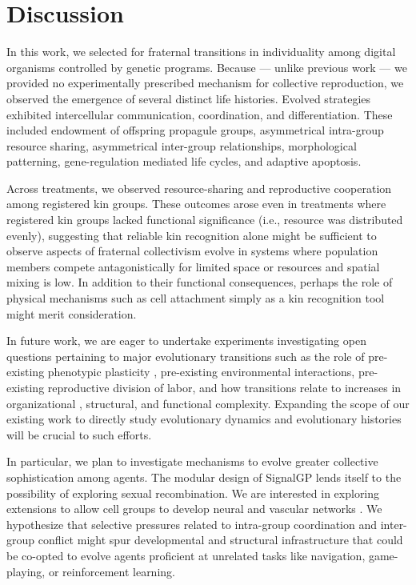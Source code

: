 \section{Discussion}


In this work, we selected for fraternal transitions in individuality among digital organisms controlled by genetic programs.
Because --- unlike previous work \citep{goldsby2012task, goldsby2014evolutionary} --- we provided no experimentally prescribed mechanism for collective reproduction, we observed the emergence of several distinct life histories.
Evolved strategies exhibited intercellular communication, coordination, and differentiation.
These included endowment of offspring propagule groups, asymmetrical intra-group resource sharing, asymmetrical inter-group relationships, morphological patterning, gene-regulation mediated life cycles, and adaptive apoptosis.

Across treatments, we observed resource-sharing and reproductive cooperation among registered kin groups.
These outcomes arose even in treatments where registered kin groups lacked functional significance (i.e., resource was distributed evenly), suggesting that reliable kin recognition alone might be sufficient to observe aspects of fraternal collectivism evolve in systems where population members compete antagonistically for limited space or resources and spatial mixing is low.
In addition to their functional consequences, perhaps the role of physical mechanisms such as cell attachment simply as a kin recognition tool might merit consideration.

In future work, we are eager to undertake experiments investigating open questions pertaining to major evolutionary transitions such as the role of pre-existing phenotypic plasticity \citep{clune2007investigating, lalejini2016evolutionary}, pre-existing environmental interactions, pre-existing reproductive division of labor, and how transitions relate to increases in organizational \citep{goldsby2012task}, structural, and functional \citep{goldsby2014evolutionary} complexity.
Expanding the scope of our existing work to directly study evolutionary dynamics and evolutionary histories will be crucial to such efforts.

In particular, we plan to investigate mechanisms to evolve greater collective sophistication among agents.
The modular design of SignalGP lends itself to the possibility of exploring sexual recombination.
We are interested in exploring extensions to allow cell groups to develop neural and vascular networks \citep{moreno2020practical}.
We hypothesize that selective pressures related to intra-group coordination and inter-group conflict might spur developmental and structural infrastructure that could be co-opted to evolve agents proficient at unrelated tasks like navigation, game-playing, or reinforcement learning.

